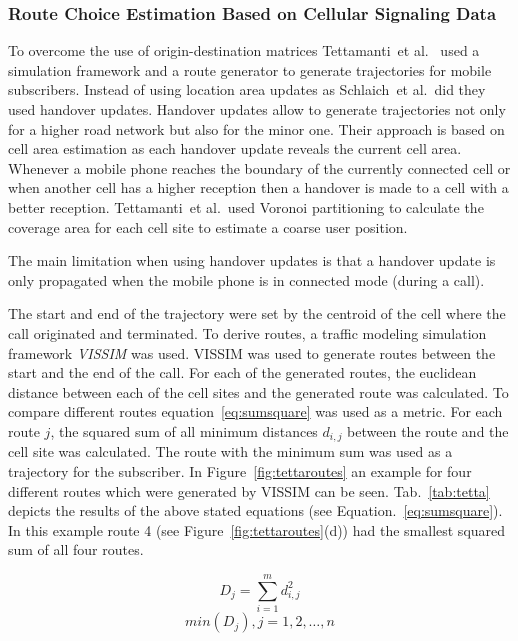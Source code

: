 \subsubsection{Route Choice Estimation Based on Cellular Signaling Data}
To overcome the use of origin-destination matrices Tettamanti~et al.\ \cite{Tettamanti2012} used a simulation framework and a route generator to generate trajectories for mobile subscribers. Instead of using location area updates as Schlaich~et al.\ did they used handover updates. Handover updates allow to generate trajectories not only for a higher road network but also for the minor one. Their approach is based on cell area estimation as each handover update reveals the current cell area. Whenever a mobile phone reaches the boundary of the currently connected cell or when another cell has a higher reception then a handover is made to a cell with a better reception. Tettamanti~et al.\ used Voronoi partitioning to calculate the coverage area for each cell site to estimate a coarse user position.

The main limitation when using handover updates is that a handover update is only propagated when the mobile phone is in connected mode (during a call).

The start and end of the trajectory were set by the centroid of the cell where the call originated and terminated. To derive routes, a traffic modeling simulation framework \emph{VISSIM} was used. VISSIM was used to generate routes between the start and the end of the call. For each of the generated routes, the euclidean distance between each of the cell sites and the generated route was calculated. To compare different routes equation~\ref{eq:sumsquare} was used  as a metric. For each route $j$, the squared sum of all minimum distances $d_{i,j}$ between the route and the cell site was calculated. The route with the minimum sum was used as a trajectory for the subscriber.
In Figure~\ref{fig:tettaroutes} an example for four different routes which were generated by VISSIM can be seen. Tab.~\ref{tab:tetta} depicts the results of the above stated equations (see Equation.\ \ref{eq:sumsquare}). In this example route 4 (see Figure~\ref{fig:tettaroutes}(d)) had the smallest squared sum of all four routes.

\begin{equation}
\label{eq:sumsquare}
D_j=\sum_{i=1}^{m} d_{i,j}^{2}
\end{equation}
\begin{equation}
\label{eq:minsum}
min(D_j), j = 1,2,\ldots,n
\end{equation}



